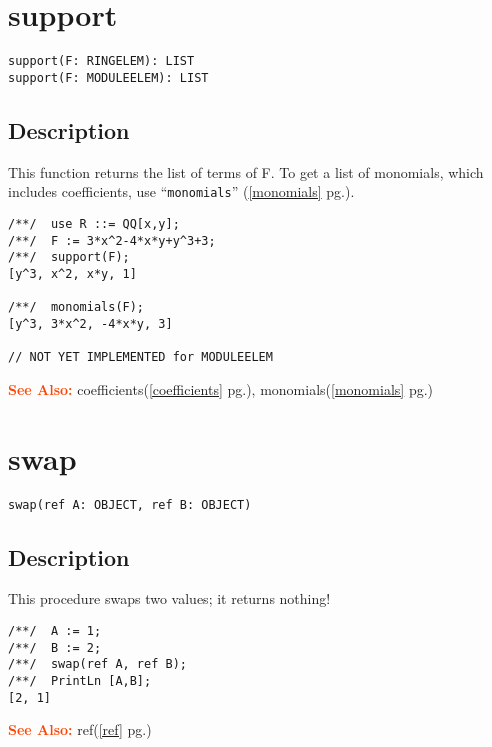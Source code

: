 \documentclass[a4paper]{mybook}
\newenvironment{command}{}{} %
\newcommand\SeeAlso{\par\textcolor{OrangeRed}{\textbf{\large See Also: }}}
\begin{document}
\section{support}
\label{support}
\begin{command} %


\begin{Verbatim}[label=syntax, rulecolor=\color{MidnightBlue},
frame=single]
support(F: RINGELEM): LIST
support(F: MODULEELEM): LIST
\end{Verbatim}


\subsection*{Description}

This function returns the list of terms of F.  To get a list of
monomials, which includes coefficients, use ``\verb&monomials&'' (\ref{monomials} pg.\pageref{monomials}).
\begin{Verbatim}[label=example, rulecolor=\color{PineGreen}, frame=single]
/**/  use R ::= QQ[x,y];
/**/  F := 3*x^2-4*x*y+y^3+3;
/**/  support(F);
[y^3, x^2, x*y, 1]

/**/  monomials(F);
[y^3, 3*x^2, -4*x*y, 3]

// NOT YET IMPLEMENTED for MODULEELEM
\end{Verbatim}


\SeeAlso %
  coefficients(\ref{coefficients} pg.\pageref{coefficients}), 
    monomials(\ref{monomials} pg.\pageref{monomials})
\end{command} %

\section{swap}
\label{swap}
\begin{command} %


\begin{Verbatim}[label=syntax, rulecolor=\color{MidnightBlue},
frame=single]
swap(ref A: OBJECT, ref B: OBJECT)
\end{Verbatim}


\subsection*{Description}

This procedure swaps two values; it returns nothing!
\begin{Verbatim}[label=example, rulecolor=\color{PineGreen}, frame=single]
/**/  A := 1;
/**/  B := 2;
/**/  swap(ref A, ref B);
/**/  PrintLn [A,B];
[2, 1]
\end{Verbatim}


\SeeAlso %
  ref(\ref{ref} pg.\pageref{ref})
\end{command} %
\end{document}
